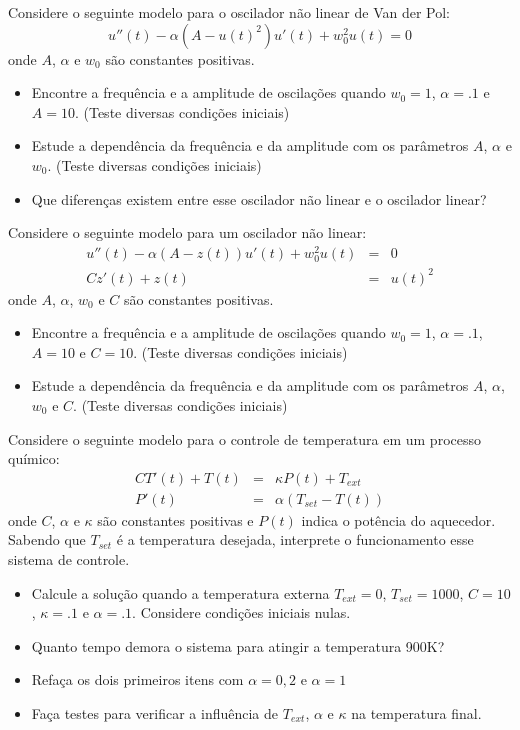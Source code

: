 \begin{exer} Considere o seguinte modelo para o oscilador não linear de Van der Pol:
$$u''(t) - \alpha (A-u(t)^2)u'(t) + w_0^2u(t)=0$$
onde $A$, $\alpha$ e $w_0$ são constantes positivas.
\begin{itemize}
\item Encontre a frequência e a amplitude de oscilações quando $w_0=1$, $\alpha=.1$ e $A=10$. (Teste diversas condições iniciais)
\item Estude a dependência da frequência e da amplitude com os parâmetros  $A$, $\alpha$ e $w_0$. (Teste diversas condições iniciais)
\item Que diferenças existem entre esse oscilador não linear e o oscilador linear?
\end{itemize}
\end{exer}

\begin{exer} Considere o seguinte modelo para um oscilador não linear:
\begin{eqnarray*}
u''(t)-\alpha(A-z(t))u'(t)+w_0^2 u(t)&=&0\\
Cz'(t)+z(t)&=&u(t)^2
\end{eqnarray*}
onde $A$, $\alpha$, $w_0$ e $C$ são constantes positivas.
\begin{itemize}
\item Encontre a frequência e a amplitude de oscilações quando $w_0=1$, $\alpha=.1$, $A=10$ e $C=10$. (Teste diversas condições iniciais)
\item Estude a dependência da frequência e da amplitude com os parâmetros  $A$, $\alpha$, $w_0$ e $C$. (Teste diversas condições iniciais)
\end{itemize}
\end{exer}

\begin{exer} Considere o seguinte modelo para o controle de temperatura em um processo químico:
\begin{eqnarray*}
CT'(t)+T(t)&=&\kappa P(t)+T_{ext}\\
P'(t)&=&\alpha(T_{set}-T(t))
\end{eqnarray*}
onde $C$, $\alpha$ e $\kappa$ são constantes positivas e $P(t)$ indica o potência do aquecedor. Sabendo que $T_{set}$ é a temperatura desejada, interprete o funcionamento esse sistema de controle.
\begin{itemize}
\item Calcule a solução quando a temperatura externa $T_{ext}=0$, $T_{set}=1000$, $C=10$, $\kappa=.1$ e $\alpha=.1$. Considere condições iniciais nulas.
\item Quanto tempo demora o sistema para atingir a temperatura 900K?
\item Refaça os dois primeiros itens com $\alpha=0,2$ e $\alpha=1$
\item Faça testes para verificar a influência de $T_{ext}$, $\alpha$ e $\kappa$ na temperatura final.
\end{itemize}
\end{exer}

